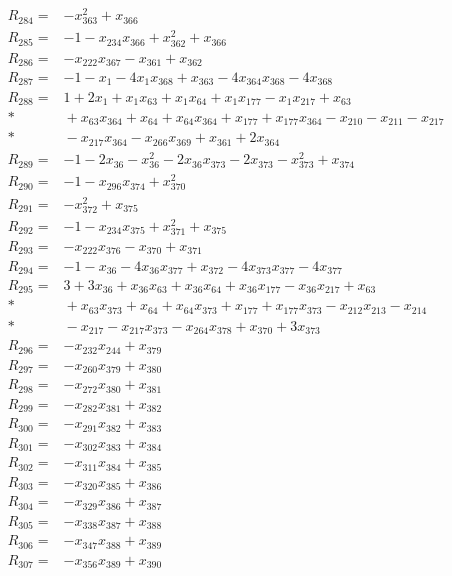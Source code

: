 \begin{align*}
R_{284}={}&-x_{363}^{2}+x_{366}\\[3pt]
R_{285}={}&-1-x_{234}x_{366}+x_{362}^{2}+x_{366}\\[3pt]
R_{286}={}&-x_{222}x_{367}-x_{361}+x_{362}\\[3pt]
R_{287}={}&-1-x_{1}-4x_{1}x_{368}+x_{363}-4x_{364}x_{368}-4x_{368}\\[3pt]
R_{288}={}&1+2x_{1}+x_{1}x_{63}+x_{1}x_{64}+x_{1}x_{177}-x_{1}x_{217}+x_{63}\\*
&{}+x_{63}x_{364}+x_{64}+x_{64}x_{364}+x_{177}+x_{177}x_{364}-x_{210}-x_{211}-x_{217}\\*
&{}-x_{217}x_{364}-x_{266}x_{369}+x_{361}+2x_{364}\\[3pt]
R_{289}={}&-1-2x_{36}-x_{36}^{2}-2x_{36}x_{373}-2x_{373}-x_{373}^{2}+x_{374}\\[3pt]
R_{290}={}&-1-x_{296}x_{374}+x_{370}^{2}\\[3pt]
R_{291}={}&-x_{372}^{2}+x_{375}\\[3pt]
R_{292}={}&-1-x_{234}x_{375}+x_{371}^{2}+x_{375}\\[3pt]
R_{293}={}&-x_{222}x_{376}-x_{370}+x_{371}\\[3pt]
R_{294}={}&-1-x_{36}-4x_{36}x_{377}+x_{372}-4x_{373}x_{377}-4x_{377}\\[3pt]
R_{295}={}&3+3x_{36}+x_{36}x_{63}+x_{36}x_{64}+x_{36}x_{177}-x_{36}x_{217}+x_{63}\\*
&{}+x_{63}x_{373}+x_{64}+x_{64}x_{373}+x_{177}+x_{177}x_{373}-x_{212}x_{213}-x_{214}\\*
&{}-x_{217}-x_{217}x_{373}-x_{264}x_{378}+x_{370}+3x_{373}\\[3pt]
R_{296}={}&-x_{232}x_{244}+x_{379}\\[3pt]
R_{297}={}&-x_{260}x_{379}+x_{380}\\[3pt]
R_{298}={}&-x_{272}x_{380}+x_{381}\\[3pt]
R_{299}={}&-x_{282}x_{381}+x_{382}\\[3pt]
R_{300}={}&-x_{291}x_{382}+x_{383}\\[3pt]
R_{301}={}&-x_{302}x_{383}+x_{384}\\[3pt]
R_{302}={}&-x_{311}x_{384}+x_{385}\\[3pt]
R_{303}={}&-x_{320}x_{385}+x_{386}\\[3pt]
R_{304}={}&-x_{329}x_{386}+x_{387}\\[3pt]
R_{305}={}&-x_{338}x_{387}+x_{388}\\[3pt]
R_{306}={}&-x_{347}x_{388}+x_{389}\\[3pt]
R_{307}={}&-x_{356}x_{389}+x_{390}\\[3pt]

\end{align*}
